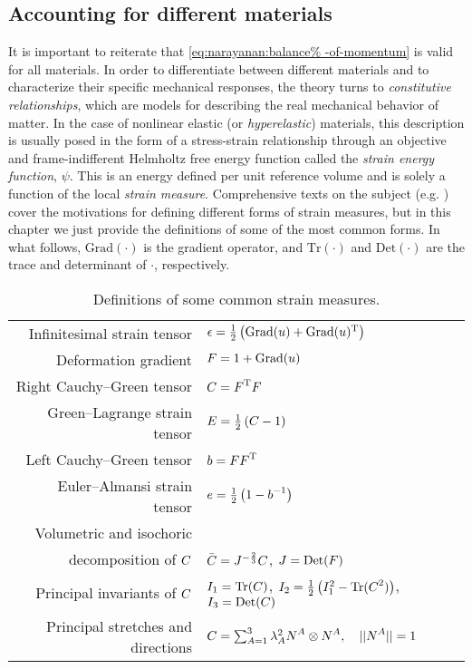 \subsection{Accounting for different materials}

It is important to reiterate that \eqref{eq:narayanan:balance%
-of-momentum} is valid for all materials. In order to differentiate
between different materials and to characterize their specific
mechanical responses, the theory turns to {\em constitutive
relationships}, which are models for describing the real mechanical
behavior of matter. In the case of nonlinear elastic (or {\em
hyperelastic}) materials, this description is usually posed in the
form of a stress-strain relationship through an objective and
frame-indifferent Helmholtz free energy function called the {\em
strain energy function}, $\psi$. This is an energy defined per unit
reference volume and is solely a function of the local {\em strain
measure}. Comprehensive texts on the subject
(e.g. \citet{Holzapfel2000}) cover the motivations for defining
different forms of strain measures, but in this chapter we just
provide the definitions of some of the most common forms. In what
follows, $\mathrm{Grad}(\cdot)$ is the gradient operator, and
$\mathrm{Tr}(\cdot)$ and $\mathrm{Det}(\cdot)$ are the trace and
determinant of $\cdot$, respectively.

\begin{table}
\def\arraystretch{1.1}\begin{tabular}{rl}
Infinitesimal strain tensor & $\mbox{$\epsilon$} = \frac{1}{2}
  \left(\mathrm{Grad}(\mbox{$ u$}) + \mathrm{Grad}(\mbox{$ u$})^{\mathrm{T}}\right)$
\\
Deformation gradient &  $\mbox{$ F$} = {1} + \mathrm{Grad}(\mbox{$ u$})$
\\
Right Cauchy--Green tensor & $\mbox{$ C$} = \mbox{$ F$}^{\mathrm{T}} \mbox{$ F$}$
\\
Green--Lagrange strain tensor & $\mbox{$ E$} = \frac{1}{2} \left(\mbox{$ C$} -
  {1}\right)$
\\
Left Cauchy--Green tensor & $\mbox{$ b$} = \mbox{$ F$} \mbox{$ F$}^{\mathrm{T}}$
\\
Euler--Almansi strain tensor &  $\mbox{$ e$} = \frac{1}{2} \left({1} -
    \mbox{$ b$}^{-1}\right)$\\
Volumetric and isochoric\\ decomposition of $\mbox{$ C$}$ &  $\bar{\mbox{$ C$}} =
  J^{-\frac{2}{3}} \mbox{$ C$}$, \quad $J = \mathrm{Det}(\mbox{$ F$})$
\\
Principal invariants of $\mbox{$ C$}$ &  $I_{1} =
  \mathrm{Tr}(\mbox{$ C$})$, $I_{2} = \frac{1}{2}\left(I_{1}^{2} -
    \mathrm{Tr}(\mbox{$ C$}^{2})\right)$, $I_{3} = \mathrm{Det}(\mbox{$ C$})$
\\
Principal stretches and directions &  $\mbox{$ C$} = \sum_{A=1}^{3}
\lambda_{A}^{2} \mbox{$ N$}^{A} \otimes \mbox{$ N$}^{A}, \quad ||\mbox{$ N$}^{A}|| = 1$
\end{tabular}
\caption{Definitions of some common strain measures.}
\label{tab:narayanan:straindefs}\vspace*{18pt}
\end{table}

